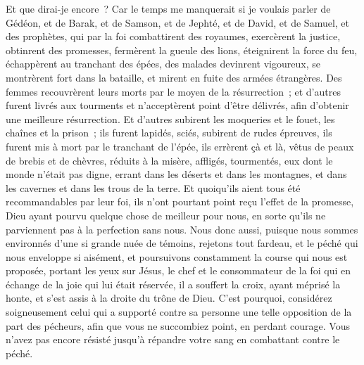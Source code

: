 \begin{multicols}{2}
Et que dirai-je encore~? Car le temps me manquerait si je voulais parler de Gédéon, et de Barak, et de Samson, et de Jephté, et de David, et de Samuel, et des prophètes,
qui par la foi combattirent des royaumes, exercèrent la justice, obtinrent des promesses, fermèrent la gueule des lions,
éteignirent la force du feu, échappèrent au tranchant des épées, des malades devinrent vigoureux, se montrèrent fort dans la bataille, et mirent en fuite des armées étrangères.
Des femmes recouvrèrent leurs morts par le moyen de la résurrection~; et d'autres furent livrés aux tourments et n'acceptèrent point d'être délivrés, afin d'obtenir une meilleure résurrection.
Et d'autres subirent les moqueries et le fouet, les chaînes et la prison~;
ils furent lapidés, sciés, subirent de rudes épreuves, ils furent mis à mort par le tranchant de l'épée, ils errèrent çà et là, vêtus de peaux de brebis et de chèvres, réduits à la misère, affligés, tourmentés,
eux dont le monde n'était pas digne, errant dans les déserts et dans les montagnes, et dans les cavernes et dans les trous de la terre.
 Et quoiqu'ils aient tous été recommandables par leur foi, ils n'ont pourtant point reçu l'effet de la promesse,
Dieu ayant pourvu quelque chose de meilleur pour nous, en sorte qu'ils ne parviennent pas à la perfection sans nous.
\VerseOne{}Nous donc aussi, puisque nous sommes environnés d'une si grande nuée de témoins, rejetons tout fardeau, et le péché qui nous enveloppe si aisément, et poursuivons constamment la course qui nous est proposée,
portant les yeux sur Jésus, le chef et le consommateur de la foi qui en échange de la joie qui lui était réservée, il a souffert la croix, ayant méprisé la honte, et s'est assis à la droite du trône de Dieu.
C'est pourquoi, considérez soigneusement celui qui a supporté contre sa personne une telle opposition de la part des pécheurs, afin que vous ne succombiez point, en perdant courage.
Vous n'avez pas encore résisté jusqu'à répandre votre sang en combattant contre le péché.

\end{multicols}
